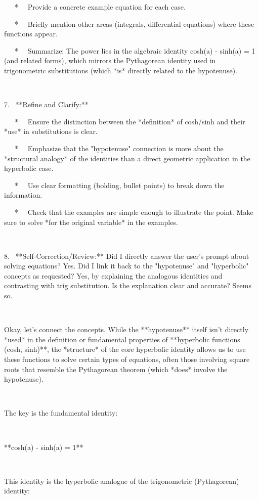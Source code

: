\documentclass{article}
\begin{document}
\ \ \ * \ \ Provide a concrete example equation for each case.

\ \ \ * \ \ Briefly mention other areas (integrals, differential equations)
where these functions appear.

\ \ \ * \ \ Summarize: The power lies in the algebraic identity
cosh{\texttwosuperior}(a) - sinh{\texttwosuperior}(a) = 1 (and related forms),
which mirrors the Pythagorean identity used in trigonometric substitutions
(which *is* directly related to the hypotenuse).

\

7. \ **Refine and Clarify:**

\ \ \ * \ \ Ensure the distinction between the *definition* of cosh/sinh and
their *use* in substitutions is clear.

\ \ \ * \ \ Emphasize that the "hypotenuse" connection is more about the
*structural analogy* of the identities than a direct geometric application in
the hyperbolic case.

\ \ \ * \ \ Use clear formatting (bolding, bullet points) to break down the
information.

\ \ \ * \ \ Check that the examples are simple enough to illustrate the
point. Make sure to solve *for the original variable* in the examples.

\

8. \ **Self-Correction/Review:** Did I directly answer the user's prompt
about solving equations? Yes. Did I link it back to the "hypotenuse" and
"hyperbolic" concepts as requested? Yes, by explaining the analogous
identities and contrasting with trig substitution. Is the explanation clear
and accurate? Seems so.

\

Okay, let's connect the concepts. While the **hypotenuse** itself isn't
directly *used* in the definition or fundamental properties of **hyperbolic
functions (cosh, sinh)**, the *structure* of the core hyperbolic identity
allows us to use these functions to solve certain types of equations, often
those involving square roots that resemble the Pythagorean theorem (which
*does* involve the hypotenuse).

\

The key is the fundamental identity:

\

**cosh{\texttwosuperior}(a) - sinh{\texttwosuperior}(a) = 1**

\

This identity is the hyperbolic analogue of the trigonometric (Pythagorean)
identity:
\end{document}
